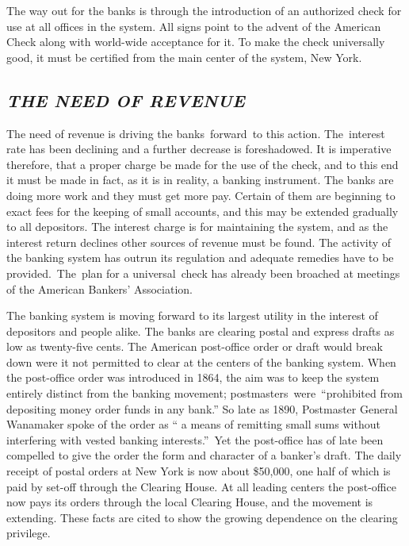 \documentclass[openany,nobib]{tufte-book}
\begin{document}
The way out for the banks is through the introduction of an authorized
check for use at all offices in the system. All signs point to the
advent of the American Check along with world-wide acceptance for it. To
make the check universally good, it must be certified from the main
center of the system, New York.~

\hypertarget{the-need-of-revenue}{%
\subsection{\texorpdfstring{\emph{THE NEED OF
REVENUE}}{THE NEED OF REVENUE}}\label{the-need-of-revenue}}

The need of revenue is driving the banks~forward~to this action.
The~interest rate has been declining and a further decrease is
foreshadowed. It is imperative therefore, that a proper charge be made
for the use of the check, and to this end it must be made in fact, as it
is in reality, a banking instrument. The banks are doing more work and
they must get more pay. Certain of them are beginning to exact fees for
the keeping of small accounts, and this may be extended gradually to all
depositors. The interest charge is for maintaining the system, and as
the interest return declines other sources of revenue must be found. The
activity of the banking system has outrun its regulation and adequate
remedies have to be provided.~The~plan for a universal~check has already
been broached at meetings of the American Bankers' Association. ~

The banking system is moving forward to its largest utility in the
interest of depositors and people alike. The banks are clearing postal
and express drafts as low as twenty-five cents. The American post-office
order or draft would break down were it not permitted to clear at the
centers of the banking system. When the post-office order was introduced
in 1864, the aim was to keep the system entirely distinct from the
banking movement; postmasters~were~``prohibited from depositing money
order funds in any bank.'' So late as 1890, Postmaster General Wanamaker
spoke of the order as `` a means of remitting small sums without
interfering with vested banking interests.''~Yet the post-office has of
late been compelled to give the order the form and character of a
banker's draft. The daily receipt of postal orders at New York is now
about \$50,000, one half of which is paid by set-off through the
Clearing House. At all leading centers the post-office now pays its
orders through the local Clearing House, and the movement is extending.
These facts are cited to show the growing dependence on the clearing
privilege.~
\end{document}
